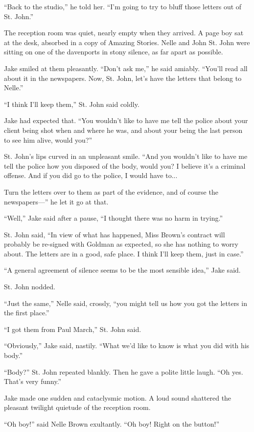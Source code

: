 \documentclass{novel}
\begin{document}
“Back to the studio,” he told her. “I’m going to try to bluff those letters out of St. John.”

The reception room was quiet, nearly empty when they arrived. A page boy sat at the desk, absorbed in a copy of Amazing Stories. Nelle and John St. John were sitting on one of the davenports in stony silence, as far apart as possible.

Jake smiled at them pleasantly. “Don’t ask me,” he said amiably. “You’ll read all about it in the newspapers. Now, St. John, let’s have the letters that belong to Nelle.”

“I think I’ll keep them,” St. John said coldly.

Jake had expected that. “You wouldn’t like to have me tell the police about your client being shot when and where he was, and about your being the last person to see him alive, would you?”

St. John’s lips curved in an unpleasant smile. “And you wouldn’t like to have me tell the police how you disposed of the body, would you? I believe it’s a criminal offense. And if you did go to the police, I would have to...

Turn the letters over to them as part of the evidence, and of course the newspapers—” he let it go at that.

“Well,” Jake said after a pause, “I thought there was no harm in trying.”

St. John said, “In view of what has happened, Miss Brown’s contract will probably be re-signed with Goldman as expected, so she has nothing to worry about. The letters are in a good, safe place. I think I’ll keep them, just in case.”

“A general agreement of silence seems to be the most sensible idea,” Jake said.

St. John nodded.

“Just the same,” Nelle said, crossly, “you might tell us how you got the letters in the first place.”

“I got them from Paul March,” St. John said.

“Obviously,” Jake said, nastily. “What we’d like to know is what you did with his body.”

“Body?” St. John repeated blankly. Then he gave a polite little laugh. “Oh yes. That’s very funny.”

Jake made one sudden and cataclysmic motion. A loud sound shattered the pleasant twilight quietude of the reception room.

“Oh boy!” said Nelle Brown exultantly. “Oh boy! Right on the button!”
\end{document}
